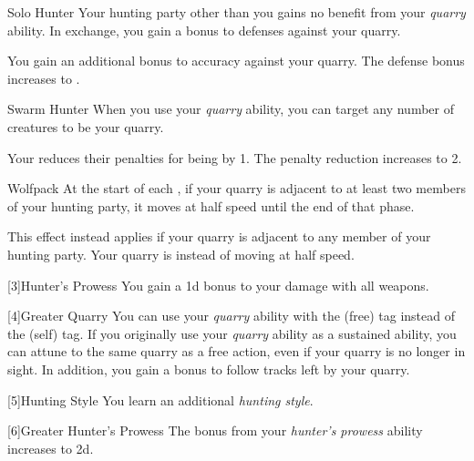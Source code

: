 {            \begin{freeability}{Solo Hunter}
                Your hunting party other than you gains no benefit from your \textit{quarry} ability.
                In exchange, you gain a  bonus to defenses against your quarry.

                \rankline
                 You gain an additional  bonus to accuracy against your quarry.
                 The defense bonus increases to .
            \end{freeability}

            \begin{freeability}{Swarm Hunter}
                When you use your \textit{quarry} ability, you can target any number of creatures to be your quarry.

                \rankline
                 Your  reduces their penalties for being  by 1.
                 The penalty reduction increases to 2.
            \end{freeability}

            \begin{freeability}{Wolfpack}
                At the start of each , if your quarry is adjacent to at least two members of your hunting party, it moves at half speed until the end of that phase.

                \rankline
                 This effect instead applies if your quarry is adjacent to any member of your hunting party.
                 Your quarry is  instead of moving at half speed.
            \end{freeability}
        }

        [3]{Hunter's Prowess} You gain a \plus1d bonus to your damage with all weapons.

        [4]{Greater Quarry} You can use your \textit{quarry} ability with the  (free) tag instead of the  (self) tag.
        If you originally use your \textit{quarry} ability as a sustained ability, you can attune to the same quarry as a free action, even if your quarry is no longer in sight.
        In addition, you gain a  bonus to follow tracks left by your quarry.

        [5]{Hunting Style}
        You learn an additional \textit{hunting style}.

        [6]{Greater Hunter's Prowess} The bonus from your \textit{hunter's prowess} ability increases to \plus2d.

